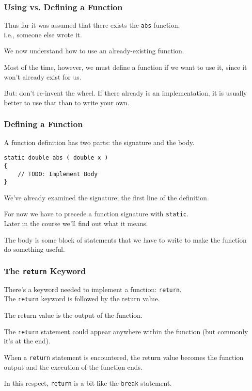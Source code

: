 \begin{frame}
\frametitle{Using vs. Defining a Function}
Thus far it was assumed that there exists the \texttt{abs} function.\\
\quad i.e., someone else wrote it.

We now understand how to use an already-existing function.

Most of the time, however, we must define a function if we want to use it, since it won't already exist for us.

But: don't re-invent the wheel. If there already is an implementation, it is usually better to use that than to write your own.

\end{frame}

\begin{frame}[fragile]
\frametitle{Defining a Function}


A function definition has two parts: the signature and the body.

\begin{verbatim}
static double abs ( double x ) 
{
    // TODO: Implement Body
}
\end{verbatim}

We've already examined the signature; the first line of the definition.

For now we have to precede a function signature with \texttt{static}.\\
\quad Later in the course we'll find out what it means.

The body is some block of statements that we have to write to make the function do something useful.

\end{frame}

\begin{frame}
\frametitle{The \texttt{return} Keyword}

There's a keyword needed to implement a function: \texttt{return}.\\
\quad The \texttt{return} keyword is followed by the \alert{return value}.

The return value is the output of the function.

The \texttt{return} statement could appear anywhere within the function (but commonly it's at the end).

When a \texttt{return} statement is encountered, the return value becomes the function output and the execution of the function ends.

In this respect, \texttt{return} is a bit like the \texttt{break} statement.

\end{frame}

